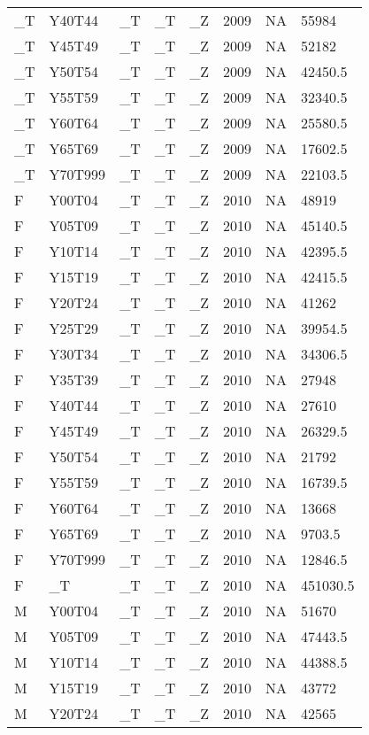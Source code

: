 \begin{longtable}[t]{llllllll}
\_T & Y40T44 & \_T & \_T & \_Z & 2009 & NA & 55984\\
\_T & Y45T49 & \_T & \_T & \_Z & 2009 & NA & 52182\\
\addlinespace
\_T & Y50T54 & \_T & \_T & \_Z & 2009 & NA & 42450.5\\
\_T & Y55T59 & \_T & \_T & \_Z & 2009 & NA & 32340.5\\
\_T & Y60T64 & \_T & \_T & \_Z & 2009 & NA & 25580.5\\
\_T & Y65T69 & \_T & \_T & \_Z & 2009 & NA & 17602.5\\
\_T & Y70T999 & \_T & \_T & \_Z & 2009 & NA & 22103.5\\
\addlinespace
F & Y00T04 & \_T & \_T & \_Z & 2010 & NA & 48919\\
F & Y05T09 & \_T & \_T & \_Z & 2010 & NA & 45140.5\\
F & Y10T14 & \_T & \_T & \_Z & 2010 & NA & 42395.5\\
F & Y15T19 & \_T & \_T & \_Z & 2010 & NA & 42415.5\\
F & Y20T24 & \_T & \_T & \_Z & 2010 & NA & 41262\\
\addlinespace
F & Y25T29 & \_T & \_T & \_Z & 2010 & NA & 39954.5\\
F & Y30T34 & \_T & \_T & \_Z & 2010 & NA & 34306.5\\
F & Y35T39 & \_T & \_T & \_Z & 2010 & NA & 27948\\
F & Y40T44 & \_T & \_T & \_Z & 2010 & NA & 27610\\
F & Y45T49 & \_T & \_T & \_Z & 2010 & NA & 26329.5\\
\addlinespace
F & Y50T54 & \_T & \_T & \_Z & 2010 & NA & 21792\\
F & Y55T59 & \_T & \_T & \_Z & 2010 & NA & 16739.5\\
F & Y60T64 & \_T & \_T & \_Z & 2010 & NA & 13668\\
F & Y65T69 & \_T & \_T & \_Z & 2010 & NA & 9703.5\\
F & Y70T999 & \_T & \_T & \_Z & 2010 & NA & 12846.5\\
\addlinespace
F & \_T & \_T & \_T & \_Z & 2010 & NA & 451030.5\\
M & Y00T04 & \_T & \_T & \_Z & 2010 & NA & 51670\\
M & Y05T09 & \_T & \_T & \_Z & 2010 & NA & 47443.5\\
M & Y10T14 & \_T & \_T & \_Z & 2010 & NA & 44388.5\\
M & Y15T19 & \_T & \_T & \_Z & 2010 & NA & 43772\\
\addlinespace
M & Y20T24 & \_T & \_T & \_Z & 2010 & NA & 42565\\

\end{longtable}
